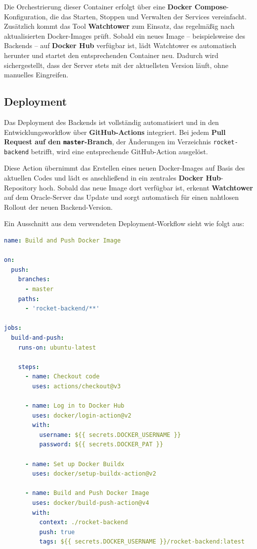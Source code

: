 \documentclass[11pt,a4paper]{article}
\begin{document}
Die Orchestrierung dieser Container erfolgt über eine \textbf{Docker Compose}-Konfiguration, die das Starten, Stoppen und Verwalten der Services vereinfacht. Zusätzlich kommt das Tool \textbf{Watchtower} zum Einsatz, das regelmäßig nach aktualisierten Docker-Images prüft. Sobald ein neues Image – beispielsweise des Backends – auf \textbf{Docker Hub}\cite{docker_hub} verfügbar ist, lädt Watchtower es automatisch herunter und startet den entsprechenden Container neu. Dadurch wird sichergestellt, dass der Server stets mit der aktuellsten Version läuft, ohne manuelles Eingreifen.

\subsection{Deployment}

Das Deployment des Backends ist vollständig automatisiert und in den Entwicklungsworkflow über \textbf{GitHub-Actions}\cite{github} integriert. Bei jedem \textbf{Pull Request auf den \texttt{master}-Branch}, der Änderungen im Verzeichnis \texttt{rocket-backend} betrifft, wird eine entsprechende GitHub-Action ausgelöst.

Diese Action übernimmt das Erstellen eines neuen Docker-Images auf Basis des aktuellen Codes und lädt es anschließend in ein zentrales \textbf{Docker Hub}-Repository hoch. Sobald das neue Image dort verfügbar ist, erkennt \textbf{Watchtower} auf dem Oracle-Server das Update und sorgt automatisch für einen nahtlosen Rollout der neuen Backend-Version.

Ein Ausschnitt aus dem verwendeten Deployment-Workflow sieht wie folgt aus:

\begin{lstlisting}[language=yaml, caption={GitHub Action zur automatisierten Bereitstellung}, label={lst:deployment}]
name: Build and Push Docker Image

on:
  push:
    branches:
      - master
    paths:
      - 'rocket-backend/**'

jobs:
  build-and-push:
    runs-on: ubuntu-latest

    steps:
      - name: Checkout code
        uses: actions/checkout@v3

      - name: Log in to Docker Hub
        uses: docker/login-action@v2
        with:
          username: ${{ secrets.DOCKER_USERNAME }}
          password: ${{ secrets.DOCKER_PAT }}

      - name: Set up Docker Buildx
        uses: docker/setup-buildx-action@v2

      - name: Build and Push Docker Image
        uses: docker/build-push-action@v4
        with:
          context: ./rocket-backend
          push: true
          tags: ${{ secrets.DOCKER_USERNAME }}/rocket-backend:latest
\end{lstlisting}
\end{document}

